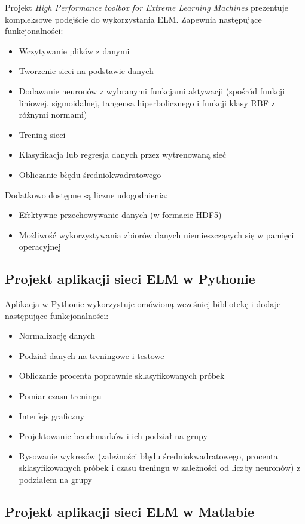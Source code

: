 \documentclass{article}
\begin{document}
Projekt \textit{High Performance toolbox for Extreme Learning Machines} prezentuje kompleksowe podejście do wykorzystania ELM. Zapewnia następujące funkcjonalności:
\begin{itemize}
\item Wczytywanie plików z danymi
\item Tworzenie sieci na podstawie danych
\item Dodawanie neuronów z wybranymi funkcjami aktywacji (spośród funkcji liniowej, sigmoidalnej, tangensa hiperbolicznego i funkcji klasy RBF z różnymi normami)
\item Trening sieci
\item Klasyfikacja lub regresja danych przez wytrenowaną sieć
\item Obliczanie błędu średniokwadratowego
\end{itemize}
Dodatkowo dostępne są liczne udogodnienia:
\begin{itemize}
\item Efektywne przechowywanie danych (w formacie HDF5)
\item Możliwość wykorzystywania zbiorów danych niemieszczących się w pamięci operacyjnej
\end{itemize}
\subsection{Projekt aplikacji sieci ELM w Pythonie}
Aplikacja w Pythonie wykorzystuje omówioną wcześniej bibliotekę i dodaje następujące funkcjonalności:
\begin{itemize}
\item Normalizację danych
\item Podział danych na treningowe i testowe
\item Obliczanie procenta poprawnie sklasyfikowanych próbek
\item Pomiar czasu treningu
\item Interfejs graficzny
\item Projektowanie benchmarków i ich podział na grupy
\item Rysowanie wykresów (zależności błędu średniokwadratowego, procenta sklasyfikowanych próbek i czasu treningu w zależności od liczby neuronów) z podziałem na grupy 
\end{itemize}



\subsection{Projekt aplikacji sieci ELM w Matlabie}
\end{document}
